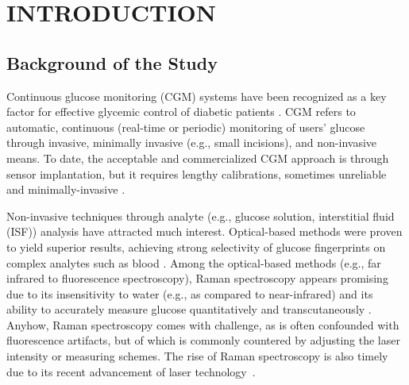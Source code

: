 \chapter{INTRODUCTION} 

\section{Background of the Study}


Continuous glucose monitoring (CGM) systems have been recognized as a key factor for effective glycemic control of diabetic patients \citep{continuous2021}.
CGM refers to automatic, continuous (real-time or periodic) monitoring of users' glucose through invasive, minimally invasive (e.g., small incisions), and non-invasive means.
To date, the acceptable and commercialized CGM approach is through sensor implantation, but it requires lengthy calibrations, sometimes unreliable and minimally-invasive \citep{CGMminimalinvasive}.

Non-invasive techniques through analyte (e.g., glucose solution, interstitial fluid (ISF)) analysis have attracted much interest.
Optical-based methods were proven to yield superior results, achieving strong selectivity of glucose fingerprints on complex analytes such as blood \citep{opticalBest}.
Among the optical-based methods (e.g., far infrared to fluorescence spectroscopy), Raman spectroscopy appears promising due to its insensitivity to water (e.g., as compared to near-infrared) and its ability to accurately measure glucose quantitatively and transcutaneously \citep{directGlucose}.
Anyhow, Raman spectroscopy comes with challenge, as is often confounded with fluorescence artifacts, but of which is commonly countered by adjusting the laser intensity or measuring schemes.  
The rise of Raman spectroscopy is also timely due to its recent advancement of laser technology~\citep{horibahistory}.

